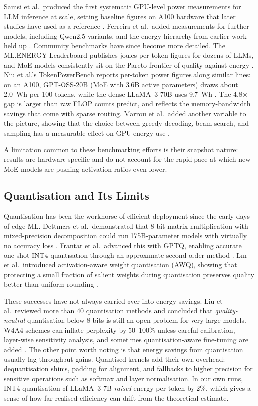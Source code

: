 \documentclass[AMS,STIX2COL]{WileyNJD-v2}
\begin{document}
Samsi et al.\ produced the first systematic GPU-level power measurements for LLM inference at scale, setting baseline figures on A100 hardware that later studies have used as a reference \cite{samsi2023words}. Ferreira et al.\ added measurements for further models, including Qwen2.5 variants, and the energy hierarchy from earlier work held up \cite{ferreira2025prompts}. Community benchmarks have since become more detailed. The ML.ENERGY Leaderboard publishes joules-per-token figures for dozens of LLMs, and MoE models consistently sit on the Pareto frontier of quality against energy \cite{mlenergy2025}. Niu et al.'s TokenPowerBench reports per-token power figures along similar lines: on an A100, GPT-OSS-20B (MoE with 3.6B active parameters) draws about 2.0~Wh per 100 tokens, while the dense LLaMA~3-70B uses 9.7~Wh \cite{niu2025tokenpowerbench}. The 4.8$\times$ gap is larger than raw FLOP counts predict, and reflects the memory-bandwidth savings that come with sparse routing. Marrou et al.\ added another variable to the picture, showing that the choice between greedy decoding, beam search, and sampling has a measurable effect on GPU energy use \cite{marrou2025decoding}.

A limitation common to these benchmarking efforts is their snapshot nature: results are hardware-specific and do not account for the rapid pace at which new MoE models are pushing activation ratios even lower.

\subsection{Quantisation and Its Limits}

Quantisation has been the workhorse of efficient deployment since the early days of edge ML. Dettmers et al.\ demonstrated that 8-bit matrix multiplication with mixed-precision decomposition could run 175B-parameter models with virtually no accuracy loss \cite{dettmers2022gptint8}. Frantar et al.\ advanced this with GPTQ, enabling accurate one-shot INT4 quantisation through an approximate second-order method \cite{frantar2023gptq}. Lin et al.\ introduced activation-aware weight quantisation (AWQ), showing that protecting a small fraction of salient weights during quantisation preserves quality better than uniform rounding \cite{lin2024awq}.

These successes have not always carried over into energy savings. Liu et al.\ reviewed more than 40 quantisation methods and concluded that \textit{quality-neutral} quantisation below 8 bits is still an open problem for very large models. W4A4 schemes can inflate perplexity by 50--100\% unless careful calibration, layer-wise sensitivity analysis, and sometimes quantisation-aware fine-tuning are added \cite{liu2024survey}. The other point worth noting is that energy savings from quantisation usually lag throughput gains. Quantised kernels add their own overhead: dequantisation shims, padding for alignment, and fallbacks to higher precision for sensitive operations such as softmax and layer normalisation. In our own runs, INT4 quantisation of LLaMA~3-7B \textit{raised} energy per token by 2\%, which gives a sense of how far realised efficiency can drift from the theoretical estimate.
\end{document}
